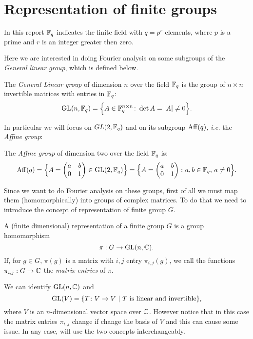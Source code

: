 \section{Representation of finite groups}
In this report ${\mathbb F}_q$ indicates the finite field with $q=p^r$ elements, where $p$ is a prime and $r$ is an integer greater then zero.

Here we are interested in doing Fourier analysis on some subgroups of the \emph{General linear group}, which is defined below. 
\begin{defn}
	The {\it General Linear group} of dimension $n$ over the field ${\mathbb F}_q$ is the group of $n\times n$ invertible matrices with entries in ${\mathbb F}_q$:
	\begin{equation*}
	\operatorname{GL}(n,{\mathbb F}_q)=\Big\{ A \in {\mathbb F}_q^{n \times n} \colon \det A = \lvert A\rvert\neq 0 \Big\}.
	\end{equation*}	
\end{defn}
In particular we will focus on $GL(2,{\mathbb F}_q)$ and on its subgroup $\operatorname{Aff}(q)$, \emph{i.e.} the \emph{Affine group}:
\begin{defn}
	The {\it Affine group} of dimension two over the field ${\mathbb F}_q$ is:
	\begin{equation*}
	\operatorname{Aff} (q)=\Big\{ A=\begin{pmatrix} a & b \\ 0 & 1 \end{pmatrix}\in \operatorname{GL}(2,{\mathbb F}_q) \Big\}=\Big\{ A=\begin{pmatrix} a & b \\ 0 & 1 \end{pmatrix} \colon a,b \in {\mathbb F}_q, \, a \neq 0 \Big \}.
	\end{equation*}
\end{defn}
Since we want to do Fourier analysis on these groups, first of all we must map them (homomorphically) into groups of complex matrices. To do that we need to introduce the concept of representation of finite group $G$.

\begin{defn}
A (finite dimensional) representation of a finite group $G$ is a group homomorphism
\[
\pi:  G \rightarrow \operatorname{GL}(n,{\mathbb C}).
\]
If, for $g\in G$, $\pi(g)$ is a matrix with $i,j$ entry $\pi_{i,j}(g)$, we call the functions $\pi_{i,j} : G \rightarrow {\mathbb C}$ the \emph{matrix entries} of $\pi$.
\end{defn}
\begin{rem}
We can identify $\operatorname{GL}(n,{\mathbb C})$ and
\[
\operatorname{GL}(V)=\{T\colon V\rightarrow V \ | \  T \text{ is linear and invertible}\},
\]
where $V$ is an $n$-dimensional vector space over ${\mathbb C}$. However notice that in this case the matrix entries $\pi_{i,j}$ change if change the basis of $V$ and this can cause some issue. In any case, will use the two concepts interchangeably.
\end{rem}

